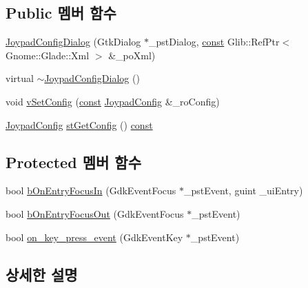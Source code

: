 \subsection*{Public 멤버 함수}
\begin{DoxyCompactItemize}
\item 
\mbox{\hyperlink{class_v_b_a_1_1_joypad_config_dialog_a056ae385dbbaa2eef8e8b8913da72b79}{Joypad\+Config\+Dialog}} (Gtk\+Dialog $\ast$\+\_\+pst\+Dialog, \mbox{\hyperlink{getopt1_8c_a2c212835823e3c54a8ab6d95c652660e}{const}} Glib\+::\+Ref\+Ptr$<$ Gnome\+::\+Glade\+::\+Xml $>$ \&\+\_\+po\+Xml)
\item 
virtual \mbox{\hyperlink{class_v_b_a_1_1_joypad_config_dialog_a22eac5cd8cf1a7b0bd05b1998e9a3313}{$\sim$\+Joypad\+Config\+Dialog}} ()
\item 
void \mbox{\hyperlink{class_v_b_a_1_1_joypad_config_dialog_a287e47a32aec963efaa309b8f031268b}{v\+Set\+Config}} (\mbox{\hyperlink{getopt1_8c_a2c212835823e3c54a8ab6d95c652660e}{const}} \mbox{\hyperlink{class_v_b_a_1_1_joypad_config}{Joypad\+Config}} \&\+\_\+ro\+Config)
\item 
\mbox{\hyperlink{class_v_b_a_1_1_joypad_config}{Joypad\+Config}} \mbox{\hyperlink{class_v_b_a_1_1_joypad_config_dialog_a8b45cad0f50bcd7ec3b422d2e535f645}{st\+Get\+Config}} () \mbox{\hyperlink{getopt1_8c_a2c212835823e3c54a8ab6d95c652660e}{const}}
\end{DoxyCompactItemize}
\subsection*{Protected 멤버 함수}
\begin{DoxyCompactItemize}
\item 
bool \mbox{\hyperlink{class_v_b_a_1_1_joypad_config_dialog_a8be1420a4a3feee2e71bde31a2d7932d}{b\+On\+Entry\+Focus\+In}} (Gdk\+Event\+Focus $\ast$\+\_\+pst\+Event, guint \+\_\+ui\+Entry)
\item 
bool \mbox{\hyperlink{class_v_b_a_1_1_joypad_config_dialog_a1e8f4908a9d7c4f027d4eeee8848a984}{b\+On\+Entry\+Focus\+Out}} (Gdk\+Event\+Focus $\ast$\+\_\+pst\+Event)
\item 
bool \mbox{\hyperlink{class_v_b_a_1_1_joypad_config_dialog_afc9f3c90aa8e8f09811c470f97ef3993}{on\+\_\+key\+\_\+press\+\_\+event}} (Gdk\+Event\+Key $\ast$\+\_\+pst\+Event)
\end{DoxyCompactItemize}


\subsection{상세한 설명}


